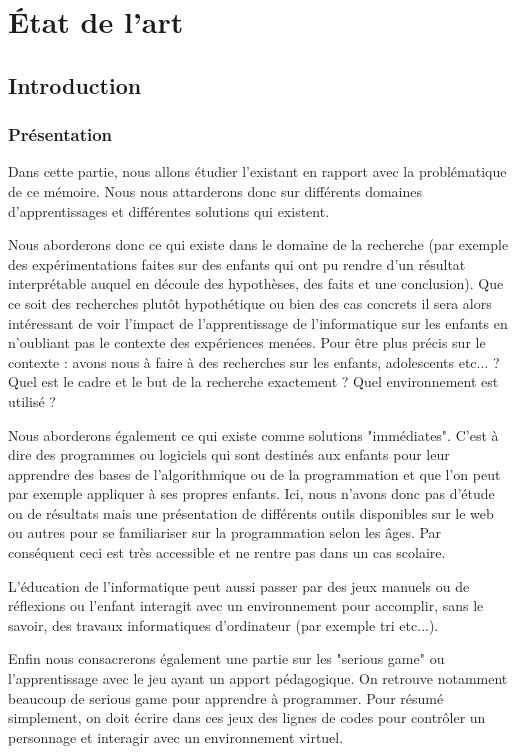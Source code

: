\chapter{État de l'art}
\label{chap:lestage}

\section{Introduction}

\subsection{Présentation}

Dans cette partie, nous allons étudier l'existant en rapport avec la problématique de ce mémoire. Nous nous attarderons donc sur différents domaines d'apprentissages et différentes solutions qui existent. 

Nous aborderons donc ce qui existe dans le domaine de la recherche (par exemple des expérimentations faites sur des enfants qui ont pu rendre d'un résultat interprétable  auquel en découle des hypothèses, des faits et une conclusion). Que ce soit des recherches plutôt hypothétique ou bien des cas concrets il sera alors intéressant de voir l'impact de l'apprentissage de l'informatique sur les enfants en n'oubliant pas le contexte des expériences menées. Pour être plus précis sur le contexte : avons nous à faire à des recherches sur les enfants, adolescents etc... ? Quel est le cadre et le but de la recherche exactement ? Quel environnement est utilisé ? 

Nous aborderons également ce qui existe comme solutions "immédiates". C'est à dire des programmes ou logiciels qui sont destinés aux enfants pour leur apprendre des bases de l'algorithmique ou de la programmation et que l'on peut par exemple appliquer à ses propres enfants. Ici, nous n'avons donc pas d'étude ou de résultats mais une présentation de différents outils disponibles sur le web ou autres pour se familiariser sur la programmation selon les âges. Par conséquent ceci est très accessible et ne rentre pas dans un cas scolaire.

L'éducation de l'informatique peut aussi passer par des jeux manuels ou de réflexions ou l'enfant interagit avec un environnement pour accomplir, sans le savoir, des travaux informatiques d'ordinateur (par exemple tri etc...).

Enfin nous consacrerons également une partie sur les "serious game" ou l'apprentissage avec le jeu ayant un apport pédagogique. On retrouve notamment beaucoup de serious game pour apprendre à programmer. Pour résumé simplement, on doit écrire dans ces jeux des lignes de codes pour contrôler un personnage et interagir avec un environnement virtuel.

